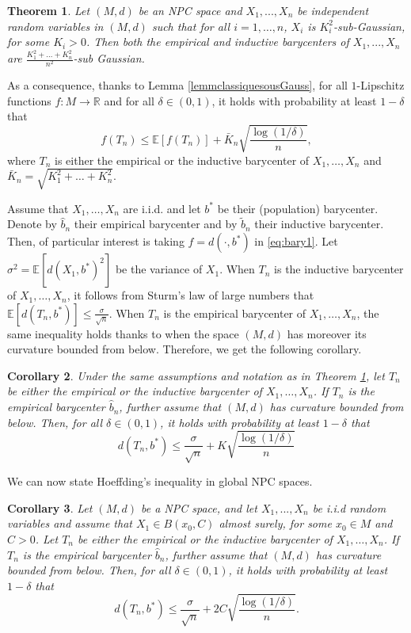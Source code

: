 \documentclass[10pt,a4paper]{article}
\theoremstyle{plain}
\newtheorem{theorem}{Theorem}[section]
\newtheorem{corollary}[theorem]{Corollary}
\theoremstyle{definition}
\theoremstyle{remark}
\newcommand{\R}{\mathbb{R}}
\newcommand{\E}{\mathbb{E}}
\begin{document}
\begin{theorem}\label{thm1}
Let $(M,d)$ be an NPC space and $X_1,...,X_n$ be independent random variables in $(M,d)$ such that for all $i=1,\ldots,n$, $X_i$ is $K_i^2$-sub-Gaussian, for some $K_i>0$. Then both the empirical and inductive barycenters of $X_1,...,X_n$ are $\frac{K_1^2+\ldots+K_n^2}{n^2}$-sub Gaussian.
\end{theorem}

As a consequence, thanks to Lemma \ref{lemmclassiquesousGauss}, for all $1$-Lipschitz functions $f:M\to\R$ and for all $\delta\in (0,1)$, it holds with probability at least $1-\delta$ that
\begin{equation} \label{eq:bary1}
    f(T_n)\leq \E[f(T_n)]+\bar K_n\sqrt{\frac{\log(1/\delta)}{n}},
\end{equation}
where $T_n$ is either the empirical or the inductive barycenter of $X_1,\ldots,X_n$ and $\bar K_n=\sqrt{K_1^2+\ldots+K_n^2}$. 

Assume that $X_1,\ldots,X_n$ are i.i.d. and let $b^*$ be their (population) barycenter. Denote by $\hat b_n$ their empirical barycenter and by $\tilde b_n$ their inductive barycenter. Then, of particular interest is taking $f=d(\cdot,b^*)$ in \eqref{eq:bary1}. Let $\sigma^2=\E[d(X_1,b^*)^2]$ be the variance of $X_1$. When $T_n$ is the inductive barycenter of $X_1,\ldots,X_n$, it follows from Sturm's law of large numbers \cite[Theorem 4.7]{sturm03} that $\E[d(T_n,b^*)]\leq \frac{\sigma}{\sqrt{n}}$. When $T_n$ is the empirical barycenter of $X_1,\ldots,X_n$, the same inequality holds thanks to \cite[Corollary 11]{fastconv} when the space $(M,d)$ has moreover its curvature bounded from below. Therefore, we get the following corollary.

\begin{corollary} \label{cor:Hoeffding}
    Under the same assumptions and notation as in Theorem \ref{thm1}, let $T_n$ be either the empirical or the inductive barycenter of $X_1,\ldots,X_n$. If $T_n$ is the empirical barycenter $\hat b_n$, further assume that $(M,d)$ has curvature bounded from below. Then, for all $\delta\in (0,1)$, it holds with probability at least $1-\delta$ that 
    $$d(T_n,b^*)\leq \frac{\sigma}{\sqrt n}+K\sqrt{\frac{\log(1/\delta)}{n}}$$
\end{corollary}

We can now state Hoeffding's inequality in global NPC spaces.

\begin{corollary}\label{hoeffding}
Let $(M,d)$ be a NPC space, and let $X_1,...,X_n$ be i.i.d random variables and assume that $X_1\in B(x_0,C)$ almost surely, for some $x_0\in M$ and $C>0$. Let $T_n$ be either the empirical or the inductive barycenter of $X_1,\ldots,X_n$. If $T_n$ is the empirical barycenter $\hat b_n$, further assume that $(M,d)$ has curvature bounded from below. Then, for all $\delta\in (0,1)$, it holds with probability at least $1-\delta$ that 
    $$d(T_n,b^*)\leq \frac{\sigma}{\sqrt n}+2C\sqrt{\frac{\log(1/\delta)}{n}}.$$
\end{corollary}
\end{document}

